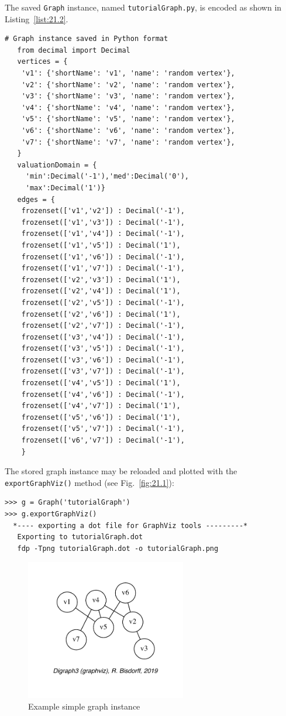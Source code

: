 The saved \texttt{Graph} instance, named \texttt{tutorialGraph.py}, is encoded as shown in Listing~\vref{list:21.2}.
\begin{lstlisting}[caption={Stored instance of a random graph},label=list:21.2]
  # Graph instance saved in Python format
   from decimal import Decimal
   vertices = {
    'v1': {'shortName': 'v1', 'name': 'random vertex'},
    'v2': {'shortName': 'v2', 'name': 'random vertex'},
    'v3': {'shortName': 'v3', 'name': 'random vertex'},
    'v4': {'shortName': 'v4', 'name': 'random vertex'},
    'v5': {'shortName': 'v5', 'name': 'random vertex'},
    'v6': {'shortName': 'v6', 'name': 'random vertex'},
    'v7': {'shortName': 'v7', 'name': 'random vertex'},
   }
   valuationDomain = {
     'min':Decimal('-1'),'med':Decimal('0'),
     'max':Decimal('1')}
   edges = {
    frozenset(['v1','v2']) : Decimal('-1'), 
    frozenset(['v1','v3']) : Decimal('-1'), 
    frozenset(['v1','v4']) : Decimal('-1'), 
    frozenset(['v1','v5']) : Decimal('1'), 
    frozenset(['v1','v6']) : Decimal('-1'), 
    frozenset(['v1','v7']) : Decimal('-1'), 
    frozenset(['v2','v3']) : Decimal('1'), 
    frozenset(['v2','v4']) : Decimal('1'), 
    frozenset(['v2','v5']) : Decimal('-1'), 
    frozenset(['v2','v6']) : Decimal('1'), 
    frozenset(['v2','v7']) : Decimal('-1'), 
    frozenset(['v3','v4']) : Decimal('-1'), 
    frozenset(['v3','v5']) : Decimal('-1'), 
    frozenset(['v3','v6']) : Decimal('-1'), 
    frozenset(['v3','v7']) : Decimal('-1'), 
    frozenset(['v4','v5']) : Decimal('1'), 
    frozenset(['v4','v6']) : Decimal('-1'), 
    frozenset(['v4','v7']) : Decimal('1'), 
    frozenset(['v5','v6']) : Decimal('1'), 
    frozenset(['v5','v7']) : Decimal('-1'), 
    frozenset(['v6','v7']) : Decimal('-1'), 
    }
\end{lstlisting}

The stored graph instance may be reloaded and plotted with the \texttt{export\-GraphViz()} method (see Fig.~\vref{fig:21.1}):
\begin{lstlisting}
>>> g = Graph('tutorialGraph')
>>> g.exportGraphViz()
  *---- exporting a dot file for GraphViz tools ---------*
   Exporting to tutorialGraph.dot
   fdp -Tpng tutorialGraph.dot -o tutorialGraph.png
\end{lstlisting}
\begin{figure}[ht]
\sidecaption[t]
\includegraphics[width=7cm]{Figures/21-1-tutorialGraph.pdf}
\caption{Example simple graph instance} 
\label{fig:21.1}       %
\end{figure}

